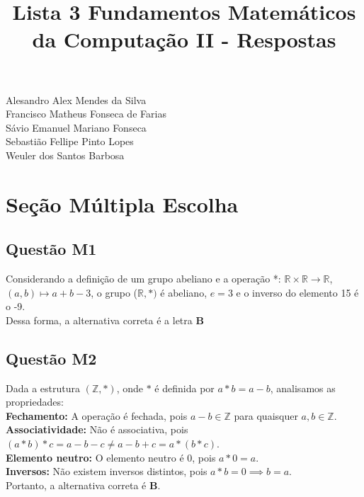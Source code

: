 \documentclass{article}
\title{Lista 3 Fundamentos Matemáticos da Computação II - Respostas}
\begin{document}
\maketitle

\begin{center}
Alesandro Alex Mendes da Silva \\
Francisco Matheus Fonseca de Farias \\
Sávio Emanuel Mariano Fonseca \\
Sebastião Fellipe Pinto Lopes \\
Weuler dos Santos Barbosa \\
\end{center}


\section{Seção Múltipla Escolha}

\subsection{Questão M1} 
Considerando a definição de um grupo abeliano e a operação
*: $\mathbb{R}\times\mathbb{R} \xrightarrow{} \mathbb{R}$, $(a,b) \mapsto a+b-3$, o grupo ($\mathbb{R},*)$ é abeliano, $e=3$ e o inverso do elemento 15 é o -9. \\

Dessa forma, a alternativa correta é a letra \textbf{B}


\subsection{Questão M2}
Dada a estrutura $(\mathbb{Z}, \ast)$, onde $\ast$ é definida por $a \ast b = a - b$, analisamos as propriedades:\\
\textbf{Fechamento:}  
A operação é fechada, pois $a - b \in \mathbb{Z}$ para quaisquer $a, b \in \mathbb{Z}$.\\
\textbf{Associatividade:}  
Não é associativa, pois $(a \ast b) \ast c = a - b - c \neq a - b + c = a \ast (b \ast c)$.\\
\textbf{Elemento neutro:}  
O elemento neutro é $0$, pois $a \ast 0 = a$.\\
\textbf{Inversos:}  
Não existem inversos distintos, pois $a \ast b = 0 \implies b = a$.\\

Portanto, a alternativa correta é \textbf{B}.
\end{document}
